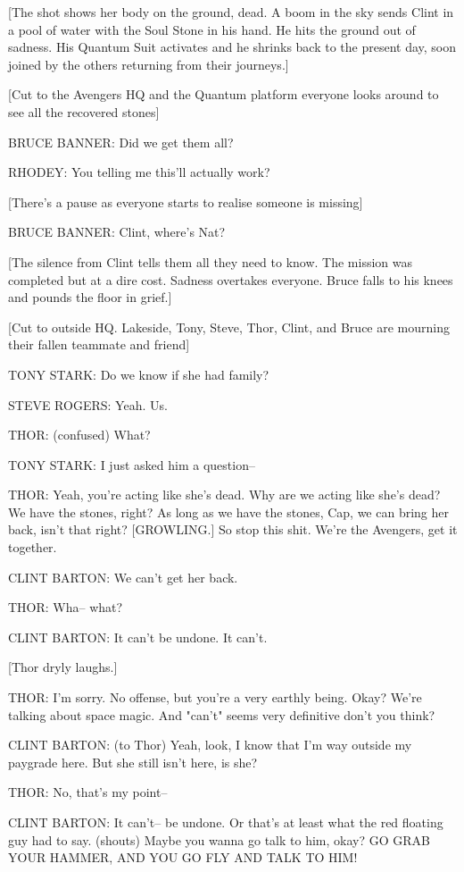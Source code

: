 [The shot shows her body on the ground, dead. A boom in the sky sends Clint in a pool of water with the Soul Stone in his hand. He hits the ground out of sadness. His Quantum Suit activates and he shrinks back to the present day, soon joined by the others returning from their journeys.]

[Cut to the Avengers HQ and the Quantum platform everyone looks around to see all the recovered stones]

BRUCE BANNER: Did we get them all?

RHODEY: You telling me this'll actually work?

[There's a pause as everyone starts to realise someone is missing]

BRUCE BANNER: Clint, where's Nat?

[The silence from Clint tells them all they need to know. The mission was completed but at a dire cost. Sadness overtakes everyone. Bruce falls to his knees and pounds the floor in grief.]

[Cut to outside HQ. Lakeside, Tony, Steve, Thor, Clint, and Bruce are mourning their fallen teammate and friend]

TONY STARK: Do we know if she had family?

STEVE ROGERS: Yeah. Us.

THOR: (confused) What?

TONY STARK: I just asked him a question–

THOR: Yeah, you're acting like she's dead. Why are we acting like she's dead? We have the stones, right? As long as we have the stones, Cap, we can bring her back, isn't that right? [GROWLING.] So stop this shit. We're the Avengers, get it together.

CLINT BARTON: We can't get her back.

THOR: Wha– what?

CLINT BARTON: It can't be undone. It can't.

[Thor dryly laughs.]

THOR: I'm sorry. No offense, but you're a very earthly being. Okay? We're talking about space magic. And "can't" seems very definitive don't you think?

CLINT BARTON: (to Thor) Yeah, look, I know that I'm way outside my paygrade here. But she still isn't here, is she?

THOR: No, that's my point–

CLINT BARTON: It can't– be undone. Or that's at least what the red floating guy had to say. (shouts) Maybe you wanna go talk to him, okay? GO GRAB YOUR HAMMER, AND YOU GO FLY AND TALK TO HIM!

